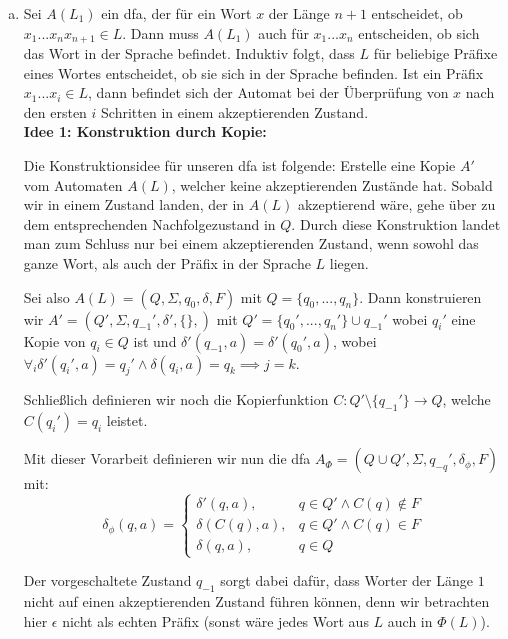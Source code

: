 \documentclass{article}
\begin{document}
\begin{enumerate}[a)]
	(iii) z.Z  $L_3 = L_1 \setminus L_2$ ist reguläre Sprache.
	
	Da $L_1 \setminus L_2 = L_1 \cup L_2^c$ ist $L_3$ nach (i) und (ii) regulär.
	
	\item Sei $A(L_1)$ ein dfa, der für ein Wort $x$ der Länge $n+1$ entscheidet, ob $x_1...x_nx_{n+1} \in L$. Dann muss $A(L_1)$ auch für $x_1 ... x_n$ entscheiden, ob sich das Wort in der Sprache befindet. Induktiv folgt, dass $L$ für beliebige Präfixe eines Wortes entscheidet, ob sie sich in der Sprache befinden. Ist ein Präfix $x_1...x_i \in L$, dann befindet sich der Automat bei der Überprüfung von $x$ nach den ersten $i$ Schritten in einem akzeptierenden Zustand.\\
	
	\textbf{Idee 1: Konstruktion durch Kopie:}
	
	Die Konstruktionsidee für unseren dfa ist folgende: Erstelle eine Kopie $A'$ vom Automaten $A(L)$, welcher keine akzeptierenden Zustände hat. Sobald wir in einem Zustand landen, der in $A(L)$ akzeptierend wäre, gehe über zu dem entsprechenden Nachfolgezustand in $Q$. Durch diese Konstruktion landet man zum Schluss nur bei einem akzeptierenden Zustand, wenn sowohl das ganze Wort, als auch der Präfix in der Sprache $L$ liegen.
	
	Sei also $A(L) = (Q, \Sigma, q_0, \delta, F)$ mit $Q = \{q_0,...,q_n\}$. Dann konstruieren wir $A' = (Q', \Sigma, q_{-1}', \delta', \{\},)$ mit $Q' = \{q_0',...,q_n'\} \cup q_{-1}'$ wobei $q_i'$ eine Kopie von $q_i \in Q$ ist und
	$\delta'(q_{-1},a) = \delta'(q_0',a) $, wobei $\forall_i  \delta'(q_i',a) = q_j' \land \delta(q_i,a) = q_k \implies j = k$.
	
	Schließlich definieren wir noch die Kopierfunktion $C: Q' \setminus \{q_{-1}'\} \to Q$, welche $C(q_i') = q_i$ leistet.
	
	
	Mit dieser Vorarbeit definieren wir nun die dfa $A_\Phi = (Q \cup Q', \Sigma, q_{-q}', \delta_\phi, F)$ mit:
	\begin{equation}
		\delta_\phi(q,a) =  \begin{cases}
		\delta'(q,a) , &q \in Q'  \land C(q) \not\in F \\ \delta(C(q),a) , &q \in Q' \land C(q) \in F \\ \delta(q,a) , &q \in Q
		\end{cases}
	\end{equation}
	
	Der vorgeschaltete Zustand $q_{-1}$ sorgt dabei dafür, dass Worter der Länge $1$ nicht auf einen akzeptierenden Zustand führen können, denn wir betrachten hier $\epsilon$ nicht als echten Präfix (sonst wäre jedes Wort aus $L$ auch in $\Phi(L)$).\\
	

\end{enumerate}
\end{document}
